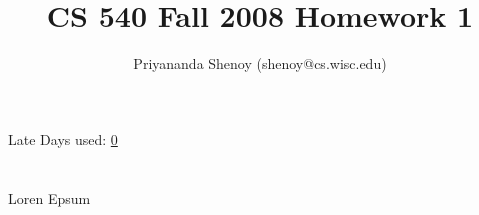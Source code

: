 \documentclass[11pt]{article}
\author{Priyananda Shenoy (shenoy@cs.wisc.edu)}
\title{
	CS 540 Fall 2008 Homework 1
}
\begin{document}
\maketitle
\begin{center}
	Late Days used: \underline{0}
\end{center}
\newpage
\section{}
Loren Epsum
\end{document}
